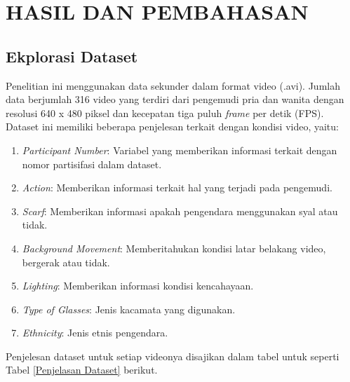 
\chapter{HASIL DAN PEMBAHASAN}

\section{Ekplorasi Dataset}

    Penelitian ini menggunakan data sekunder dalam format video (.avi). Jumlah data berjumlah 316 video yang terdiri dari pengemudi pria dan wanita dengan resolusi 640 x 480 piksel dan kecepatan tiga puluh \textit{frame} per detik (FPS). Dataset ini memiliki beberapa penjelesan terkait dengan kondisi video, yaitu:
    
    \begin{enumerate}
        \item \textit{Participant Number}: Variabel yang memberikan informasi terkait dengan nomor partisifasi dalam dataset.
        \item \textit{Action}: Memberikan informasi terkait hal yang terjadi pada pengemudi.
        \item \textit{Scarf}:  Memberikan informasi apakah pengendara menggunakan syal atau tidak.
        \item \textit{Background Movement}: Memberitahukan kondisi latar belakang video, bergerak atau tidak.
        \item \textit{Lighting}: Memberikan informasi kondisi kencahayaan.
        \item  \textit{Type of Glasses}: Jenis kacamata yang digunakan.
        \item  \textit{Ethnicity}: Jenis etnis pengendara.
        
    \end{enumerate}

    Penjelesan dataset untuk setiap videonya disajikan dalam tabel untuk seperti Tabel \ref{Penjelasan Dataset} berikut.

